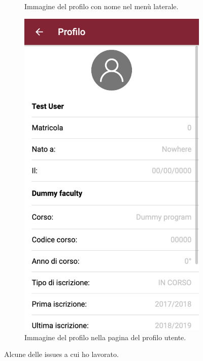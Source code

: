 \documentclass[Lau, oneside, noexaminfo]{sapthesis}%
\begin{document}
\begin{figure}[H]
\begin{subfigure}{0.6\textwidth}
		\caption{Immagine del profilo con nome nel menù laterale.}
	\end{subfigure}
	\begin{subfigure}{0.6\textwidth}
		\label{subfig:5}
		\centering
		\includegraphics[width=0.5\linewidth]{issues/propic-2}
		\caption{Immagine del profilo nella pagina del profilo utente.}
	\end{subfigure}
	\caption{Alcune delle issues a cui ho lavorato.}
	\label{fig:issues}
\end{figure}
\end{document}
